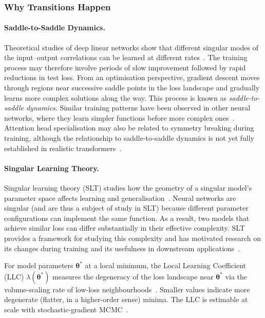 \subsubsection{Why Transitions Happen}\label{sec:training_phase_why}

\paragraph{Saddle-to-Saddle Dynamics.} Theoretical studies of deep linear networks show that different singular modes of the input--output correlations can be learned at different rates~. The training process may therefore involve periods of slow improvement followed by rapid reductions in test loss. From an optimisation perspective, gradient descent moves through regions near successive saddle points in the loss landscape and gradually learns more complex solutions along the way. This process is known as \emph{saddle-to-saddle dynamics}. Similar training patterns have been observed in other neural networks, where they learn simpler functions before more complex ones~. Attention head specialisation may also be related to symmetry breaking during training, although the relationship to saddle-to-saddle dynamics is not yet fully established in realistic transformers~.

\paragraph{Singular Learning Theory.} Singular learning theory (SLT) studies how the geometry of a singular model's parameter space affects learning and generalisation~. Neural networks are singular (and are thus a subject of study in SLT) because different parameter configurations can implement the same function. As a result, two models that achieve similar loss can differ substantially in their effective complexity. SLT provides a framework for studying this complexity and has motivated research on its changes during training and its usefulness in downstream applications~.

\begin{definitionbox}
For model parameters $\mathbf{\theta}^*$ at a local minimum, the Local Learning Coefficient (LLC) $\lambda(\mathbf{\theta}^*)$ measures the degeneracy of the loss landscape near $\mathbf{\theta}^*$ via the volume-scaling rate of low-loss neighbourhoods~. Smaller values indicate more degenerate (flatter, in a higher-order sense) minima. The LLC is estimable at scale with stochastic-gradient MCMC~.
\end{definitionbox}

